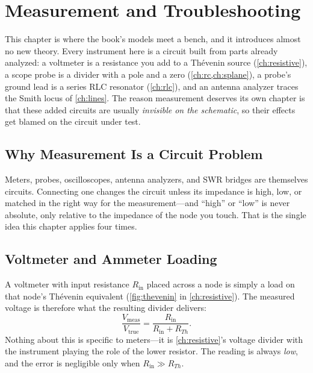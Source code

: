 \chapter{Measurement and Troubleshooting}
\label{ch:measurement}
This chapter is where the book's models meet a bench, and it introduces almost no new
theory. Every instrument here is a circuit built from parts already analyzed: a
voltmeter is a resistance you add to a Th\'evenin source (\cref{ch:resistive}), a
scope probe is a divider with a pole and a zero (\cref{ch:rc,ch:splane}), a probe's
ground lead is a series RLC resonator (\cref{ch:rlc}), and an antenna analyzer traces
the Smith locus of \cref{ch:lines}. The reason measurement deserves its own chapter is
that these added circuits are usually \emph{invisible on the schematic}, so their
effects get blamed on the circuit under test.

\section{Why Measurement Is a Circuit Problem}
Meters, probes, oscilloscopes, antenna analyzers, and SWR bridges are themselves
circuits. Connecting one changes the circuit unless its impedance is high, low, or
matched in the right way for the measurement---and ``high'' or ``low'' is never
absolute, only relative to the impedance of the node you touch. That is the single
idea this chapter applies four times.

\section{Voltmeter and Ammeter Loading}
A voltmeter with input resistance \(R_{\mathrm{in}}\) placed across a node is simply
a load on that node's Th\'evenin equivalent (\cref{fig:thevenin} in
\cref{ch:resistive}). The measured voltage is therefore what the resulting divider
delivers:
\[
\frac{V_{\text{meas}}}{V_{\text{true}}}
=\frac{R_{\mathrm{in}}}{R_{\mathrm{in}}+R_{Th}} .
\]
Nothing about this is specific to meters---it is \cref{ch:resistive}'s voltage
divider with the instrument playing the role of the lower resistor. The reading is
always \emph{low}, and the error is negligible only when
\(R_{\mathrm{in}}\gg R_{Th}\).

